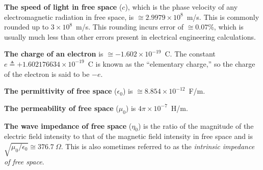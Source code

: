 
\label{m0141_Physical_Constants} %

{\bf The speed of light in free space} 
($c$), which is the phase velocity of any electromagnetic radiation in free space, is $\cong 2.9979 \times 10^8$~m/s.  This is commonly rounded up to $3 \times 10^8$~m/s. This rounding incurs error of $\cong 0.07$\%, which is usually much less than other errors present in electrical engineering calculations.

{\bf The charge of an electron} 
is $\cong -1.602 \times 10^{-19}$~C.
The constant $e\triangleq +1.602176634 \times 10^{-19}$~C is known as the ``elementary charge,'' so the charge of the electron is said to be $-e$. 

{\bf The permittivity of free space} ($\epsilon_0$) is $\cong 8.854 \times 10^{-12}$~F/m.

{\bf The permeability of free space} ($\mu_0$) is $4\pi \times 10^{-7}$~H/m.

{\bf The wave impedance of free space} 
($\eta_0$) is the ratio of the magnitude of the electric field intensity to that of the magnetic field intensity in free space and is $\sqrt{\mu_0/\epsilon_0}\cong 376.7~\Omega$.  This is also sometimes referred to as the \emph{intrinsic impedance of free space}.

